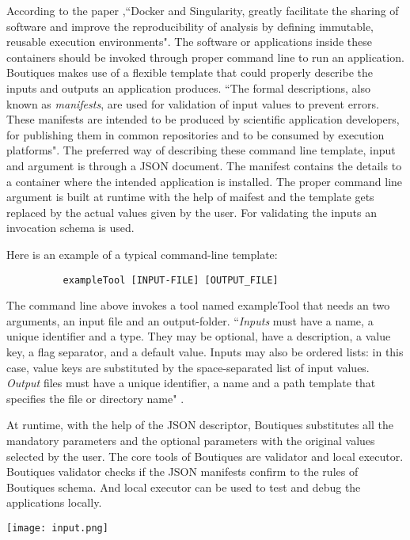 According to the paper \cite{boutiques} ,``Docker and Singularity, greatly facilitate the sharing of software and improve the reproducibility of analysis by defining immutable, reusable execution environments". The software or applications inside these containers should be invoked through proper command line to run an application. Boutiques makes use of a flexible template that could properly describe the inputs and outputs an application produces. ``The formal descriptions, also known as \textit{manifests}, are used for validation of input values to prevent errors. These manifests are intended to be produced by scientific application developers, for publishing them in common repositories and to be consumed by execution platforms". The preferred way of describing these command line template, input and argument is through a JSON document. The manifest contains the details to a container where the intended application is installed. The proper command line argument is built at runtime with the help of maifest and the template gets replaced by the actual values given by the user. For validating the inputs an invocation schema is used. 

Here is an example of a typical command-line template:

\begin{verbatim}
          exampleTool [INPUT-FILE] [OUTPUT_FILE]
\end{verbatim}

The command line above invokes a tool named exampleTool that needs an two arguments, an input file and an output-folder. ``\textit{Inputs} must have a name, a unique identifier and a type. They may be optional, have a description, a value key, a flag separator, and a default value. Inputs may also be ordered lists: in this case, value keys are substituted by the space-separated list of input values. \textit{Output} files must have a unique identifier, a name and a path template that specifies the file or directory name" \cite{boutiques}.

At runtime, with the help of the JSON descriptor, Boutiques substitutes all the mandatory parameters and the optional parameters with the original values selected by the user. The core tools of Boutiques are validator and local executor. Boutiques validator checks if the JSON manifests confirm to the rules of Boutiques schema. And local executor can be used to test and debug the applications locally.

\begin{center}
\texttt{[image: input.png]}
\label{fig:input}
\end{center}

